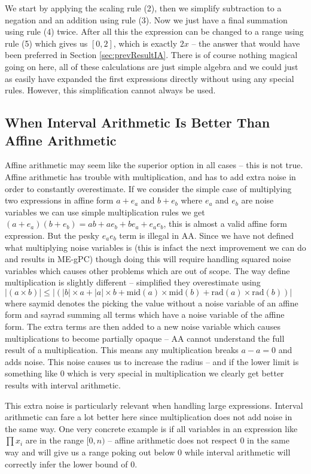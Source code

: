 We start by applying the scaling rule (2), then we simplify subtraction to a negation and an addition using rule (3). Now we just have a final summation using rule (4) twice. After all this the expression can be changed to a range using rule (5) which gives us $[0, 2]$, which is exactly $2x$ -- the answer that would have been preferred in Section \ref{sec:prevResultIA}. There is of course nothing magical going on here, all of these calculations are just simple algebra and we could just as easily have expanded the first expressions directly without using any special rules. However, this simplification cannot always be used. 

\subsection{When Interval Arithmetic Is Better Than Affine Arithmetic}
Affine arithmetic may seem like the superior option in all cases -- this is not true. Affine arithmetic has trouble with multiplication, and has to add extra noise in order to constantly overestimate. If we consider the simple case of multiplying two expressions in affine form $a + e_a$ and $b + e_b$ where $e_a$ and $e_b$ are noise variables we can use simple multiplication rules we get $(a + e_a)(b + e_b) = ab + ae_b + be_a + e_ae_b$, this is almost a valid affine form expression. But the pesky $e_ae_b$ term is illegal in AA. Since we have not defined what multiplying noise variables is (this is infact the next improvement we can do and results in  ME-gPC) though doing this will require handling squared noise variables which causes other problems which are out of scope. The way \cite{src:affAri} define multiplication is slightly different -- simplified they overestimate using $|(a \times b)| \leq |(|b| \times a + |a| \times b + \text{mid}(a) \times \text{mid}(b) + \text{rad}(a) \times \text{rad}(b))|$ where say{mid} denotes the picking the value without a noise variable of an affine form and say{rad} summing all terms which have a noise variable of the affine form. The extra terms are then added to a new noise variable which causes multiplications to become partially opaque -- AA cannot understand the full result of a multiplication. This means any multiplication breaks $a - a = 0$ and adds noise. This noise causes us to increase the radius -- and if the lower limit is something like $0$ which is very special in multiplication we clearly get better results with interval arithmetic.

This extra noise is particularly relevant when handling large expressions. Interval arithmetic can fare a lot better here since multiplication does not add noise in the same way. One very concrete example is if all variables in an expression like $\prod x_i$ are in the range $[0,n)$ -- affine arithmetic does not respect $0$ in the same way and will give us a range poking out below $0$ while interval arithmetic will correctly infer the lower bound of $0$.

